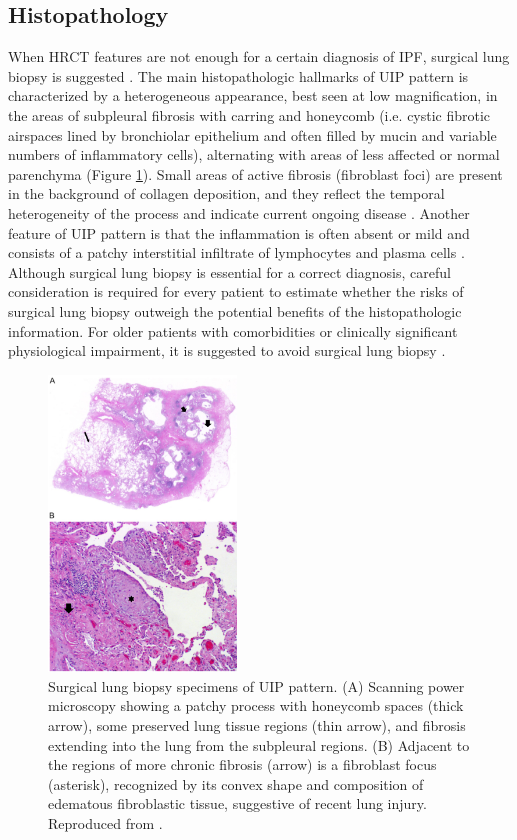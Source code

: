 \subsection{Histopathology}
When HRCT features are not enough for a certain diagnosis of IPF, surgical lung biopsy is suggested \citep{richeldi2017idiopathic}. The main histopathologic hallmarks of UIP pattern is characterized by a heterogeneous appearance, best seen at low magnification, in the areas of subpleural fibrosis with carring and honeycomb (i.e. cystic fibrotic airspaces lined by bronchiolar epithelium and often filled by mucin and variable numbers of inflammatory cells), alternating with areas of less affected or normal parenchyma \citep{ american2000idiopathic, travis2002american} (Figure \ref{fig:SurgicalLungBiopsy}). Small areas of active fibrosis (fibroblast foci) are present in the background of collagen deposition, and they reflect the temporal heterogeneity of the process and indicate current ongoing disease \citep{king2011idiopathic}. Another feature of UIP pattern is that the inflammation is often absent or mild and consists of a patchy interstitial infiltrate of lymphocytes and plasma cells \citep{raghu2011official,king2011idiopathic}. Although surgical lung biopsy is essential for a correct diagnosis, careful consideration is required for every patient to estimate whether the risks of surgical lung biopsy outweigh the potential benefits of the histopathologic information. For older patients with comorbidities or clinically significant physiological impairment, it is suggested to avoid surgical lung biopsy \citep{richeldi2017idiopathic}.

\begin{figure}[htbp]
  \centering 
  \includegraphics[height=3.1in]{Background/Image/SurgicalLungBiopsy.png}
  \caption{ Surgical lung biopsy specimens of UIP pattern. (A) Scanning power microscopy showing a patchy process with honeycomb
spaces (thick arrow), some preserved lung tissue regions (thin arrow), and fibrosis extending into the lung from the subpleural regions. (B) Adjacent to the regions of more chronic fibrosis (arrow) is a fibroblast focus (asterisk), recognized by its convex shape and composition of edematous fibroblastic tissue, suggestive of recent lung injury. Reproduced from \citep{raghu2011official}.}
  \label{fig:SurgicalLungBiopsy}
\end{figure}

